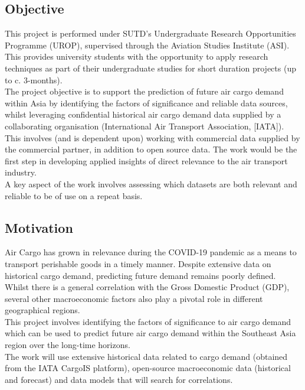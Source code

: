 \documentclass{article}
\begin{document}
\subsection{Objective}

This project is performed under SUTD’s Undergraduate Research Opportunities Programme (UROP), supervised through the Aviation Studies Institute (ASI). This provides university students with the opportunity to apply research techniques as part of their undergraduate studies for short duration projects (up to c. 3-months). \\

\noindent The project objective is to support the prediction of future air cargo demand within Asia by identifying the factors of significance and reliable data sources, whilst leveraging confidential historical air cargo demand data supplied by a collaborating organisation (International Air Transport Association, [IATA]). \\

\noindent This involves (and is dependent upon) working with commercial data supplied by the commercial partner, in addition to open source data. The work would be the first step in developing applied insights of direct relevance to the air transport industry. \\

\noindent A key aspect of the work involves assessing which datasets are both relevant and reliable to be of use on a repeat basis.

\subsection{Motivation}

Air Cargo has grown in relevance during the COVID-19 pandemic as a means to transport perishable goods in a timely manner. Despite extensive data on historical cargo demand, predicting future demand remains poorly defined. Whilst there is a general correlation with the Gross Domestic Product (GDP), several other macroeconomic factors also play a pivotal role in different geographical regions. \\

\noindent This project involves identifying the factors of significance to air cargo demand which can be used to predict future air cargo demand within the Southeast Asia region over the long-time horizons. \\

\noindent The work will use extensive historical data related to cargo demand (obtained from the IATA CargoIS platform), open-source macroeconomic data (historical and forecast) and data models that will search for correlations. \\
\end{document}
